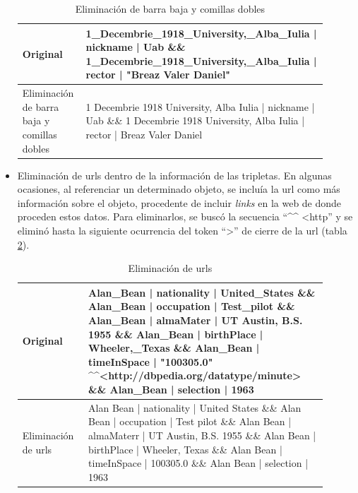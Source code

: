 \begin{itemize}
      
    \begin{table}[h!]
    \begin{center}
    \begin{tabular}{p{0.2\linewidth} | p{0.7\linewidth}}
    Original & 1\textcolor{codepurple}{\_}Decembrie\textcolor{codepurple}{\_}1918\textcolor{codepurple}{\_}University,\textcolor{codepurple}{\_}Alba\textcolor{codepurple}{\_}Iulia | nickname | Uab \&\& 1\textcolor{codepurple}{\_}Decembrie\textcolor{codepurple}{\_}1918\textcolor{codepurple}{\_}University,\textcolor{codepurple}{\_}Alba\textcolor{codepurple}{\_}Iulia | rector | \textcolor{codepurple}{"}Breaz Valer Daniel\textcolor{codepurple}{"}\\ \hline
    Eliminación de barra baja y comillas dobles & 1 Decembrie 1918 University, Alba Iulia | nickname | Uab \&\& 1 Decembrie 1918 University, Alba Iulia | rector |  Breaz Valer Daniel \\
    \end{tabular}
    \caption{Eliminación de barra baja y comillas dobles}
    \label{tab:clean_}
    \end{center}
    \end{table}
    
   \item Eliminación de urls dentro de la información de las tripletas. En algunas ocasiones, al referenciar un determinado objeto, se incluía la url como más información sobre el objeto, procedente de incluir \textit{links} en la web de donde proceden estos datos. Para eliminarlos, se buscó la secuencia ``\^{ }\^{ } <http'' y se eliminó hasta la siguiente ocurrencia del token ``>'' de cierre de la url (tabla \ref{tab:clean_url}). 
    
      
    \begin{table}[h!]
    \begin{center}
    \begin{tabular}{p{0.2\linewidth} | p{0.7\linewidth}}
    Original & Alan\_Bean | nationality | United\_States \&\& Alan\_Bean | occupation | Test\_pilot \&\& Alan\_Bean | almaMater | UT Austin, B.S. 1955 \&\& Alan\_Bean | birthPlace | Wheeler,\_Texas \&\& Alan\_Bean | timeInSpace | "100305.0" \textcolor{codepurple}{\^{}\^{}<http://dbpedia.org/datatype/minute>} \&\& Alan\_Bean | selection | 1963\\ \hline
    Eliminación de urls & Alan Bean | nationality | United States \&\& Alan Bean | occupation | Test pilot \&\& Alan Bean | almaMaterr |  UT Austin, B.S. 1955  \&\& Alan Bean | birthPlace | Wheeler, Texas \&\& Alan Bean | timeInSpace |  100305.0 \&\& Alan Bean | selection | 1963 \\
    \end{tabular}
    \caption{Eliminación de urls}
    \label{tab:clean_url}
    \end{center}
    \end{table}
    

\end{itemize}
